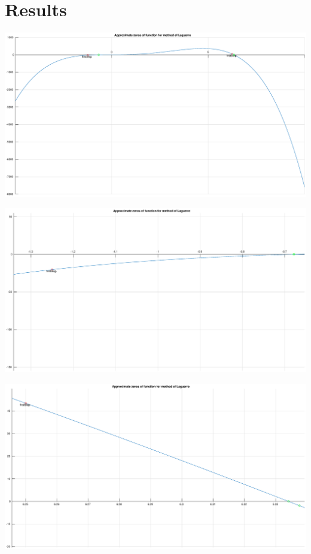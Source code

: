 \documentclass[12pt]{report}
\begin{document}
\section{Results}

\begin{center}
   \includegraphics[scale=0.25]{task3overall.eps}
\end{center}


\begin{center}
   \includegraphics[scale=0.25]{task3left.eps}
\end{center}

\begin{center}
   \includegraphics[scale=0.25]{task3right.eps}
\end{center}
\end{document}
